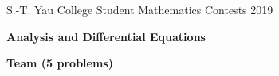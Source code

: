 \documentclass[10pt]{article}
\begin{document}





\begin{center}
S.-T. Yau College Student Mathematics Contests 2019

\vspace{0.1cm}

\Large {\bf Analysis and Differential Equations}

\vspace{0.1cm}

\large {\bf Team (5 problems)}

\vspace{0.1cm}
\end{center}
\end{document}
